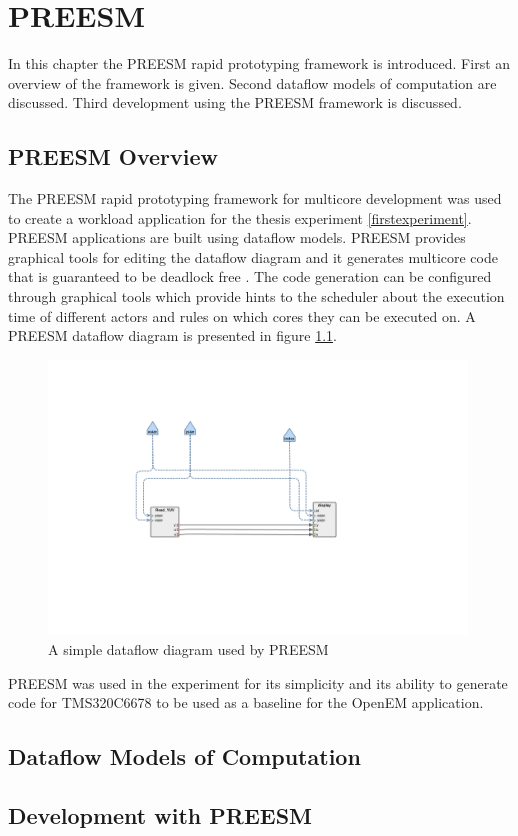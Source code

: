 \chapter{PREESM}
\label{chapter:preesm}
In this chapter the PREESM rapid prototyping framework is introduced. First an
overview of the framework is given. Second dataflow models of computation are
discussed. Third development using the PREESM framework is discussed.

\section{PREESM Overview}
\label{sec:preesmover}
The PREESM rapid prototyping framework for multicore development was used to
create a workload application for the thesis experiment \ref{firstexperiment}.
PREESM applications are built using dataflow models. PREESM provides graphical
tools for editing the dataflow diagram and it generates multicore code that is
guaranteed to be deadlock free \cite{pelcat2014preesm}. The code generation can
be configured through graphical tools which provide hints to the scheduler about
the execution time of different actors and rules on which cores they can be
executed on. A PREESM dataflow diagram is presented in figure
\ref{preesm_example}.

\begin{figure}[h!] \label{preesm_example} \begin{center}
    \includegraphics[width=0.99\textwidth]{images/example_preesm_diagram.png}
    \caption{A simple dataflow diagram used by PREESM} \end{center}
\end{figure}

PREESM was used in the experiment for its simplicity and its ability to generate
code for TMS320C6678 to be used as a baseline for the OpenEM application.

\section{Dataflow Models of Computation}
\label{sec:dataflow}

\section{Development with PREESM}
\label{sec:preesmdev}
